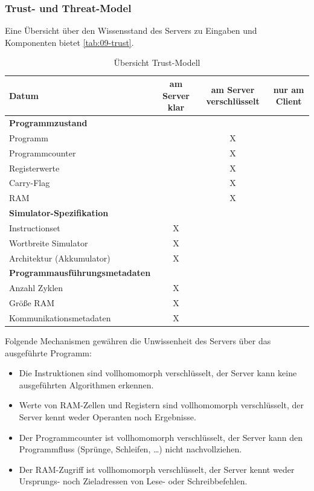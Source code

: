 \subsubsection{Trust- und Threat-Model}
Eine Übersicht über den Wissensstand des Servers zu Eingaben und Komponenten bietet \autoref{tab:09-trust}.

\begin{table}[htbp]
    \centering
    \caption{Übersicht Trust-Modell}
    \label{tab:09-trust}
    \small
    \begin{tabularx}{\textwidth}{X c c c}
\toprule
\textbf{Datum} & \textbf{am Server klar} & \textbf{am Server verschlüsselt} & \textbf{nur am Client} \\
\midrule
\textbf{Programmzustand} &&&\\
Programm &  & X & \\
Programmcounter & & X & \\
Registerwerte & & X & \\
Carry-Flag & & X & \\
RAM & & X & \\
\midrule
\textbf{Simulator-Spezifikation} &&&\\
Instructionset & X &  & \\
Wortbreite Simulator & X &  & \\
Architektur (Akkumulator) & X &  & \\
\midrule
\textbf{Programmausführungsmetadaten} &&&\\
Anzahl Zyklen & X &  & \\
Größe RAM & X &  & \\
\midrule
Kommunikationsmetadaten & X &  & \\
\bottomrule
    \end{tabularx}
\end{table}

Folgende Mechanismen gewähren die Unwissenheit des Servers über das ausgeführte Programm:
\begin{itemize}
    \item Die Instruktionen sind vollhomomorph verschlüsselt, der Server kann keine ausgeführten Algorithmen erkennen.
    \item Werte von RAM-Zellen und Registern sind vollhomomorph verschlüsselt, der Server kennt weder Operanten noch Ergebnisse.
    \item Der Programmcounter ist vollhomomorph verschlüsselt, der Server kann den Programmfluss (Sprünge, Schleifen, \ldots) nicht nachvollziehen.
    \item Der RAM-Zugriff ist vollhomomorph verschlüsselt, der Server kennt weder Ursprungs- noch Zieladressen von Lese- oder Schreibbefehlen.
\end{itemize}

